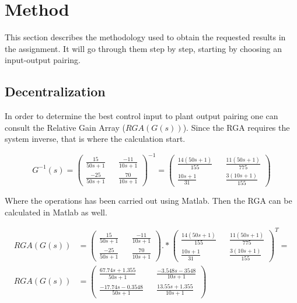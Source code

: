 \documentclass[a4paper, titlepage]{article}
\begin{document}
\section{Method}
This section describes the methodology used to obtain the requested results in the assignment.
It will go through them step by step, starting by choosing an input-output pairing.

\subsection{Decentralization}
In order to determine the best control input to plant output pairing one can consult the Relative Gain Array ($RGA(G(s))$).
Since the RGA requires the system inverse, that is where the calculation start.

\begin{equation}
G^{-1}(s) = 
\begin{pmatrix}
\frac{15}{50s + 1} && \frac{-11}{10s + 1} \\[6pt]
\frac{-25}{50s + 1} && \frac{70}{10s + 1}
\end{pmatrix}^{-1} = 
\begin{pmatrix}
\frac{14(50s + 1)}{155} && \frac{11(50s + 1)}{775} \\[6pt]
\frac{10s + 1}{31} && \frac{3(10s + 1)}{155}
\end{pmatrix}
\label{equ:inverse}
\end{equation}

Where the operations has been carried out using Matlab.
Then the RGA can be calculated in Matlab as well.

\begin{equation}
\begin{split}
RGA(G(s)) &= 
\begin{pmatrix}
\frac{15}{50s + 1} && \frac{-11}{10s + 1} \\[6pt]
\frac{-25}{50s + 1} && \frac{70}{10s + 1}
\end{pmatrix} .* 
\begin{pmatrix}
\frac{14(50s + 1)}{155} && \frac{11(50s + 1)}{775} \\[6pt]
\frac{10s + 1}{31} && \frac{3(10s + 1)}{155}
\end{pmatrix}^T = \\
RGA(G(s)) &= 
\begin{pmatrix}
\frac{67.74s + 1.355}{50s + 1} && \frac{-3.548s - 3548}{10s + 1} \\[6pt]
\frac{-17.74s - 0.3548}{50s + 1} && \frac{13.55s + 1.355}{10s + 1}
\end{pmatrix}
\end{split}
\end{equation} 
\end{document}
